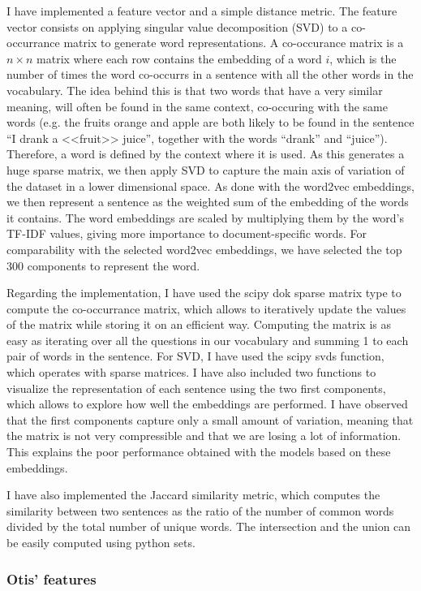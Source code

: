 \documentclass[11pt,a4paper]{article}
\begin{document}
I have implemented a feature vector and a simple distance metric. The feature vector consists on applying singular value decomposition (SVD) to a co-occurrance matrix to generate word representations. A co-occurance matrix is a $n \times n$ matrix where each row contains the embedding of a word $i$, which is the number of times the word co-occurrs in a sentence with all the other words in the vocabulary. The idea behind this is that two words that have a very similar meaning, will often be found in the same context, co-occuring with the same words (e.g. the fruits orange and apple are both likely to be found in the sentence ``I drank a <<fruit>> juice'', together with the words ``drank'' and ``juice''). Therefore, a word is defined by the context where it is used. As this generates a huge sparse matrix, we then apply SVD to capture the main axis of variation of the dataset in a lower dimensional space. 
As done with the word2vec embeddings, we then represent a sentence as the weighted sum of the embedding of the words it contains. The word embeddings are scaled by multiplying them by the word's TF-IDF values, giving more importance to document-specific words.  For comparability with the selected word2vec embeddings, we have selected the top 300 components to represent the word.

Regarding the implementation, I have used the scipy dok sparse matrix type to compute the co-occurrance matrix, which allows to iteratively update the values of the matrix while storing it on an efficient way. Computing the matrix is as easy as iterating over all the questions in our vocabulary and summing 1 to each pair of words in the sentence. For SVD, I have used the scipy svds function, which operates with sparse matrices. I have also included two functions to visualize the representation of each sentence using the two first components, which allows to explore how well the embeddings are performed. I have observed that the first components capture only a small amount of variation, meaning that the matrix is not very compressible and that we are losing a lot of information. This explains the poor performance obtained 
with the models based on these embeddings.

I have also implemented the Jaccard similarity metric, which computes the similarity between two sentences as the ratio of the number of common words divided by the total number of unique words. The intersection and the union can be easily computed using python sets.

\subsubsection{Otis' features}
\end{document}
